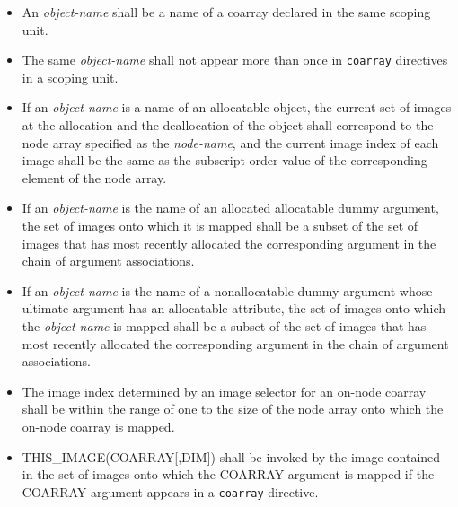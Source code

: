 \begin{itemize}
 \item An {\it object-name} shall be a name of a coarray declared 
       in the same scoping unit.

 \item The same {\it object-name} shall not appear more than once
       in {\tt coarray} directives in a scoping unit.

 \item If an {\it object-name} is a name of an allocatable object,
       the current set of images
       at the allocation and the deallocation of the
       object shall correspond to the node array specified as the {\it
       node-name}, and the current image index of each image shall 
       be the same as the subscript order value of the corresponding
       element of the node array.

 \item If an {\it object-name} is the name of an allocated allocatable
       dummy argument,
       the set of images onto which it is mapped
       shall be a subset of the set of images that has most recently
       allocated 
       the corresponding argument in the chain of argument associations.
       
 \item If an {\it object-name} is the name of a nonallocatable dummy argument
       whose ultimate argument has an allocatable attribute,
       the set of images onto which the {\it object-name} is mapped
       shall be a subset of the set of images that has most recently
       allocated 
       the corresponding argument in the chain of argument associations.

 \item The image index determined by an image selector for an on-node
       coarray shall be within the range of one to the size of the node
       array onto which the on-node coarray is mapped.

 \item 
THIS\_IMAGE(COARRAY[,DIM]) shall be invoked by
the image contained in the set of images onto which
the COARRAY argument is mapped
if the COARRAY argument appears in a {\tt coarray} directive.


\end{itemize}

